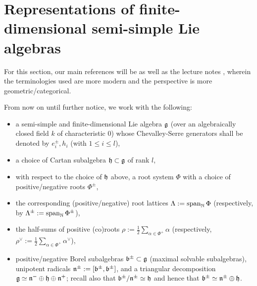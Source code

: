 \section{Representations of finite-dimensional semi-simple Lie algebras}
    For this section, our main references will be \cite[Chapter VI]{humphreys_lie_algebras} as well as the lecture notes \cite{gaitsgory_semi_simple_lie_algebras_notes}, wherein the terminologies used are more modern and the perspective is more geometric/categorical.

    \begin{convention} \label{conv: a_fixed_semi_simple_lie_algebra}
        From now on until further notice, we work with the following:
            \begin{itemize}
                \item a semi-simple and finite-dimensional Lie algebra $\mathfrak{g}$ (over an algebraically closed field $k$ of characteristic $0$) whose Chevalley-Serre generators shall be denoted by $e_i^{\pm}, h_i$ (with $1 \leq i \leq l$),
                \item a choice of Cartan subalgebra $\mathfrak{h} \subset \mathfrak{g}$ of rank $l$,
                \item with respect to the choice of $\mathfrak{h}$ above, a root system $\Phi$ with a choice of positive/negative roots $\Phi^{\pm}$,
                \item the corresponding (positive/negative) root lattices $\Lambda := \operatorname{span}_{\mathbb{N}} \Phi$ (respectively, by $\Lambda^{\pm} := \operatorname{span}_{\mathbb{N}} \Phi^{\pm}$), 
                \item the half-sums of positive (co)roots $\rho := \frac12 \sum_{\alpha \in \Phi^+} \alpha$ (respectively, $\rho^{\vee} := \frac12 \sum_{\alpha \in \Phi^+} \alpha^{\vee}$),
                \item positive/negative Borel subalgebras $\mathfrak{b}^{\pm} \subset \mathfrak{g}$ (maximal solvable subalgebras), unipotent radicals $\mathfrak{n}^{\pm} := [\mathfrak{b}^{\pm}, \mathfrak{b}^{\pm}]$, and a triangular decomposition $\mathfrak{g} \simeq \mathfrak{n}^- \oplus \mathfrak{h} \oplus \mathfrak{n}^+$; recall also that $\mathfrak{b}^{\pm}/\mathfrak{n}^{\pm} \simeq \mathfrak{h}$ and hence that $\mathfrak{b}^{\pm} \simeq \mathfrak{n}^{\pm} \oplus \mathfrak{h}$. 
            \end{itemize}
    \end{convention}

